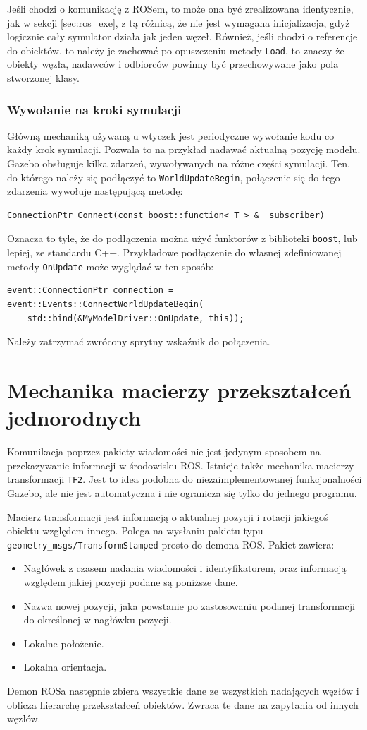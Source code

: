 		Jeśli chodzi o komunikację z ROSem, to może ona być zrealizowana identycznie, jak w sekcji \ref{sec:ros_exe}, 
		z tą różnicą, że nie jest wymagana inicjalizacja, gdyż logicznie cały symulator działa jak jeden węzeł.
		Również, jeśli chodzi o referencje do obiektów, to należy je zachować po opuszczeniu metody \texttt{Load}, to znaczy
		że obiekty węzła, nadawców i odbiorców powinny być przechowywane jako pola stworzonej klasy.

		\subsubsection{Wywołanie na kroki symulacji}
			Główną mechaniką używaną u wtyczek jest periodyczne wywołanie kodu co każdy krok symulacji.
			Pozwala to na przykład nadawać aktualną pozycję modelu.
			Gazebo obsługuje kilka zdarzeń, wywoływanych na różne części symulacji.
			Ten, do którego należy się podłączyć to \texttt{WorldUpdateBegin}, połączenie się do tego zdarzenia wywołuje następującą metodę:
			\begin{verbatim}
ConnectionPtr Connect(const boost::function< T > & _subscriber)	
			\end{verbatim}
			Oznacza to tyle, że do podłączenia można użyć funktorów z biblioteki \texttt{boost}, lub lepiej, ze standardu C++.
			Przykładowe podłączenie do własnej zdefiniowanej metody \texttt{OnUpdate} może wyglądać w ten sposób:
			\begin{verbatim}
event::ConnectionPtr connection = event::Events::ConnectWorldUpdateBegin(
	std::bind(&MyModelDriver::OnUpdate, this));
			\end{verbatim}
			Należy zatrzymać zwrócony sprytny wskaźnik do połączenia.
			
\section{Mechanika macierzy przekształceń jednorodnych}
	\label{sec:frames}
	Komunikacja poprzez pakiety wiadomości nie jest jedynym sposobem na przekazywanie informacji w środowisku ROS.
	Istnieje także mechanika macierzy transformacji \texttt{TF2}.
	Jest to idea podobna do niezaimplementowanej funkcjonalności Gazebo, ale nie jest automatyczna i nie ogranicza się tylko do jednego programu.
	
	Macierz transformacji jest informacją o aktualnej pozycji i rotacji jakiegoś obiektu względem innego.
	Polega na wysłaniu pakietu typu \texttt{geometry\_msgs/TransformStamped} prosto do demona ROS.
	Pakiet zawiera:
	\begin{itemize}
		\item Nagłówek z czasem nadania wiadomości i identyfikatorem, oraz informacją względem jakiej pozycji podane są poniższe dane.
		\item Nazwa nowej pozycji, jaka powstanie po zastosowaniu podanej transformacji do określonej w nagłówku pozycji.
		\item Lokalne położenie.
		\item Lokalna orientacja.
	\end{itemize}
	Demon ROSa następnie zbiera wszystkie dane ze wszystkich nadających węzłów i oblicza hierarchę przekształceń obiektów.
	Zwraca te dane na zapytania od innych węzłów.
	
